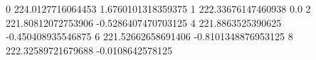 0 224.0127716064453 1.6760101318359375
1 222.33676147460938 0.0
2 221.80812072753906 -0.5286407470703125
4 221.8863525390625 -0.450408935546875
6 221.52662658691406 -0.8101348876953125
8 222.32589721679688 -0.0108642578125
